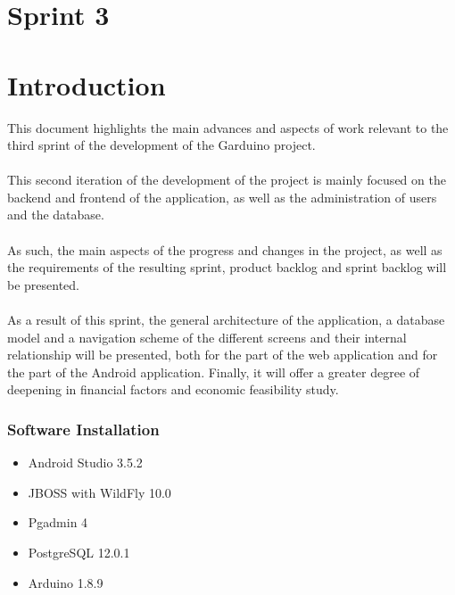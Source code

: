 \documentclass[11pt,a4paper]{article}
\begin{document}
\tableofcontents

\newpage

\vspace*{0.3in}
\listoftables
\listoffigures
\newpage

\part*{Sprint 3}
\part*{Introduction}
This document highlights the main advances and aspects of work relevant to the third sprint of the development of the Garduino project. 
\\ \\
This second iteration of the development of the project is mainly focused on the backend and frontend of the application, as well as the administration of users and the database. 
\\ \\
As such, the main aspects of the progress and changes in the project, as well as the requirements of the resulting sprint, product backlog and sprint backlog will be presented. 
\\ \\
As a result of this sprint, the general architecture of the application, a database model and a navigation scheme of the different screens and their internal relationship will be presented, both for the part of the web application and for the part of the Android application. Finally, it will offer a greater degree of deepening in financial factors and economic feasibility study.
\section{Software Installation}
\begin{itemize}
    \item Android Studio 3.5.2
    \item JBOSS with WildFly 10.0
    \item Pgadmin 4
    \item PostgreSQL 12.0.1
    \item Arduino 1.8.9
\end{itemize}
\end{document}
